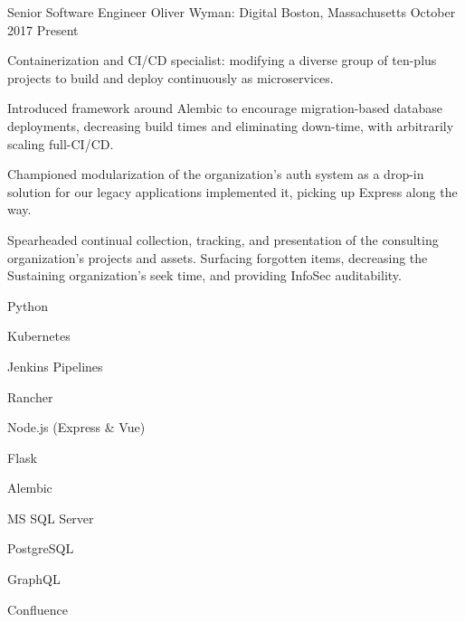 

\begin{cventries}

  \cventry%
    {Senior Software Engineer} %
    {Oliver Wyman: Digital} %
    {Boston, Massachusetts} %
    {October 2017 \- Present} %
    {%
      \begin{cvitems} %
        \item Containerization and CI/CD specialist: modifying a diverse group of ten-plus projects to build and deploy continuously as microservices.
        \item Introduced framework around Alembic to encourage migration-based database deployments, decreasing build times and eliminating down-time, with arbitrarily scaling full-CI/CD\@.
        \item Championed modularization of the organization's auth system as a drop-in solution for our legacy applications \- implemented it, picking up Express along the way.
        \item Spearheaded continual collection, tracking, and presentation of the consulting organization's projects and assets. Surfacing forgotten items, decreasing the Sustaining organization's seek time, and providing InfoSec auditability.
      \end{cvitems}
    }
    \begin{cventryskills}
      \item Python
      \item Kubernetes
      \item Jenkins Pipelines
      \item Rancher
      \item Node.js (Express \& Vue)
      \item Flask
      \item Alembic
      \item MS SQL Server
      \item PostgreSQL
      \item GraphQL
      \item Confluence%
    \end{cventryskills}


\end{cventries}
